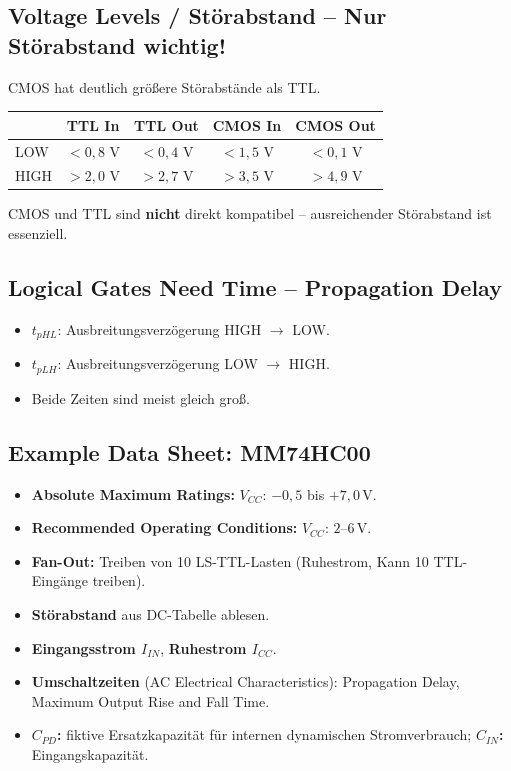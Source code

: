 \documentclass[11pt,a4paper]{article}
\begin{document}
\subsection{Voltage Levels / Störabstand -- Nur Störabstand wichtig!}
CMOS hat deutlich größere Störabstände als TTL.

\begin{center}
\begin{tabular}{lcccc}
    \toprule
    & TTL In & TTL Out & CMOS In & CMOS Out \\ \midrule
    LOW  & $<0{,}8$ V & $<0{,}4$ V & $<1{,}5$ V & $<0{,}1$ V \\
    HIGH & $>2{,}0$ V & $>2{,}7$ V & $>3{,}5$ V & $>4{,}9$ V \\ \bottomrule
\end{tabular}
\end{center}
CMOS und TTL sind \textbf{nicht} direkt kompatibel -- ausreichender Störabstand ist essenziell.

\subsection{Logical Gates Need Time -- Propagation Delay}
\begin{itemize}
    \item $t_{pHL}$: Ausbreitungsverzögerung HIGH $\to$ LOW.
    \item $t_{pLH}$: Ausbreitungsverzögerung LOW $\to$ HIGH.
    \item Beide Zeiten sind meist gleich groß.
\end{itemize}

\subsection{Example Data Sheet: MM74HC00}
\begin{itemize}
    \item \textbf{Absolute Maximum Ratings:} $V_{CC}$: $-0{,}5$ bis $+7{,}0\,\text{V}$.
    \item \textbf{Recommended Operating Conditions:} $V_{CC}$: $2$--$6\,\text{V}$.
    \item \textbf{Fan-Out:} Treiben von 10 LS-TTL-Lasten (Ruhestrom, Kann 10 TTL-Eingänge treiben).
    \item \textbf{Störabstand} aus DC-Tabelle ablesen.
    \item \textbf{Eingangsstrom $I_{IN}$}, \textbf{Ruhestrom $I_{CC}$}.
    \item \textbf{Umschaltzeiten} (AC Electrical Characteristics):
        Propagation Delay, Maximum Output Rise and Fall Time.
    \item \textbf{$C_{PD}$:} fiktive Ersatzkapazität für internen dynamischen Stromverbrauch; \textbf{$C_{IN}$:} Eingangskapazität.
\end{itemize}
\end{document}
